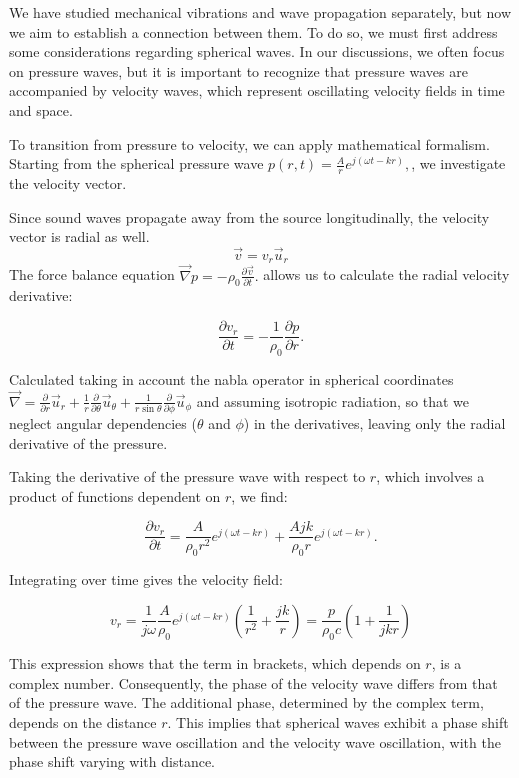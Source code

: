 \documentclass[a4paper]{article}
\begin{document}
We have studied mechanical vibrations and wave propagation separately, but now we aim to establish a connection between them. To do so, we must first address some considerations regarding spherical waves. In our discussions, we often focus on pressure waves, but it is important to recognize that pressure waves are accompanied by velocity waves, which represent oscillating velocity fields in time and space.

To transition from pressure to velocity, we can apply mathematical formalism. Starting from the spherical pressure wave \(
p(r, t) = \frac{A}{r} e^{j(\omega t - kr)},
\), we investigate the velocity vector.

Since sound waves propagate away from the source longitudinally, the velocity vector is radial as well. 
\[
\vec{v} = v_r \vec{u}_r
\]
The force balance equation \(
\vec{\nabla} p = -\rho_0 \frac{\partial \vec{v}}{\partial t}.
\) allows us to calculate the radial velocity derivative:

\[
\frac{\partial v_r}{\partial t} = -\frac{1}{\rho_0} \frac{\partial p}{\partial r}.
\]

Calculated taking in account the nabla operator in spherical coordinates \( 
\vec{\nabla} = \frac{\partial}{\partial r} \vec{u}_r + \frac{1}{r} \frac{\partial}{\partial \theta} \vec{u}_\theta + \frac{1}{r \sin \theta} \frac{\partial}{\partial \phi} \vec{u}_\phi
\) and assuming isotropic radiation, so that we neglect angular dependencies (\(\theta\) and \(\phi\)) in the derivatives, leaving only the radial derivative of the pressure. 


Taking the derivative of the pressure wave with respect to \(r\), which involves a product of functions dependent on \(r\), we find:

\[
\frac{\partial v_r}{\partial t} = \frac{A}{\rho_0 r^2} e^{j(\omega t - kr)} + \frac{A j k}{\rho_0 r} e^{j(\omega t - kr)}.
\]

Integrating over time gives the velocity field:

\[
v_r = \frac{1}{j \omega} \frac{A}{\rho_0} e^{j(\omega t - kr)} \left(\frac{1}{r^2} + \frac{j k}{r}\right) = \frac{p}{\rho_0 c} \left( 1 + \frac{1}{j k r} \right)
\]

This expression shows that the term in brackets, which depends on \(r\), is a complex number. Consequently, the phase of the velocity wave differs from that of the pressure wave. The additional phase, determined by the complex term, depends on the distance \(r\). This implies that spherical waves exhibit a phase shift between the pressure wave oscillation and the velocity wave oscillation, with the phase shift varying with distance.
\end{document}
